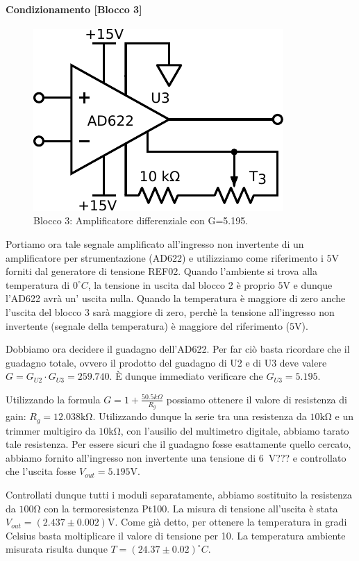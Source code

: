 \paragraph{Condizionamento [Blocco 3]\newline}

\begin{figure}
\centering
\includegraphics[width=.25\textwidth]{../E06/latex/P3.pdf}
\caption{Blocco 3: Amplificatore differenziale con G=5.195.}
\label{cir6:2wire}
\end{figure}

Portiamo ora tale segnale amplificato all'ingresso non invertente di un amplificatore per strumentazione (AD622) e utilizziamo come riferimento i $5\si{\volt}$ forniti dal generatore di tensione REF02.
Quando l'ambiente si trova alla temperatura di $0^{\circ}C$, la tensione in uscita dal blocco 2 è proprio $5\si{\volt}$ e dunque l'AD622 avrà un' uscita nulla.
Quando la temperatura è maggiore di zero anche l'uscita del blocco 3 sarà maggiore di zero, perchè la tensione all'ingresso non invertente (segnale della temperatura) è maggiore del riferimento ($5\si{\volt}$).

Dobbiamo ora decidere il guadagno dell'AD622.
Per far ciò basta ricordare che il guadagno totale, ovvero il prodotto del guadagno di U2 e di U3 deve valere $G= G_{U2}\cdot G_{U3}=259.740$.
È dunque immediato verificare che $G_{U3}=5.195$.

Utilizzando la formula $G=1+\frac{50.5k\Omega}{R_g}$ possiamo ottenere il valore di resistenza di gain: $R_g=12.038\si{\kilo\ohm}$.
Utilizzando dunque la serie tra una resistenza da $10\si{\kilo\ohm}$ e un trimmer multigiro da $10\si{\kilo\ohm}$, con l'ausilio del multimetro digitale, abbiamo tarato tale resistenza. 
Per essere sicuri che il guadagno fosse esattamente quello cercato, abbiamo fornito all'ingresso non invertente una tensione di \SI{6}{\volt}??? e controllato che l'uscita fosse $V_{out}=5.195 \si{\volt}$. 

Controllati dunque tutti i moduli separatamente, abbiamo sostituito la resistenza da $100\si{\ohm}$ con la termoresistenza Pt100.
La misura di tensione all'uscita è stata $V_{out}=(2.437\pm 0.002)\si{\volt}$.
Come già detto, per ottenere la temperatura in gradi Celsius basta moltiplicare il valore di tensione per 10.
La temperatura ambiente misurata risulta dunque $T=(24.37\pm0.02)^{\circ}C$.

